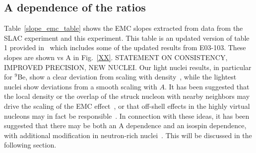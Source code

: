 \subsection{A dependence of the ratios}\label{adepresult.ssec}





Table~\ref{slope_emc_table} shows the EMC slopes extracted from data from
the SLAC experiment and this experiment. This table is an updated version of
table 1 provided in~\cite{arrington12c} which includes some of the updated
results from E03-103. These slopes are shown vs A in Fig.~\ref{XX}.
STATEMENT ON CONSISTENCY, IMPROVED PRECISION, NEW NUCLEI. Our light nuclei
results, in particular for $^9$Be, show a clear deviation from scaling with
density~\cite{seely09}, while the lightest nuclei show deviations from a
smooth scaling with $A$.  It has been suggested that the local density
or the overlap of the struck nucleon with nearby neighbors may drive the
scaling of the EMC effect~\cite{seely09, arrington12c,??}, or that off-shell
effects in the highly virtual nucleons may in fact be
responsible~\cite{weinstein11}.  In connection with these ideas, it has been
suggested that there may be both an A dependence and an isospin dependence,
with additional modification in neutron-rich nuclei~\cite{arrington12c,
hen13, sargsian12}.  This will be discussed in the following section.


